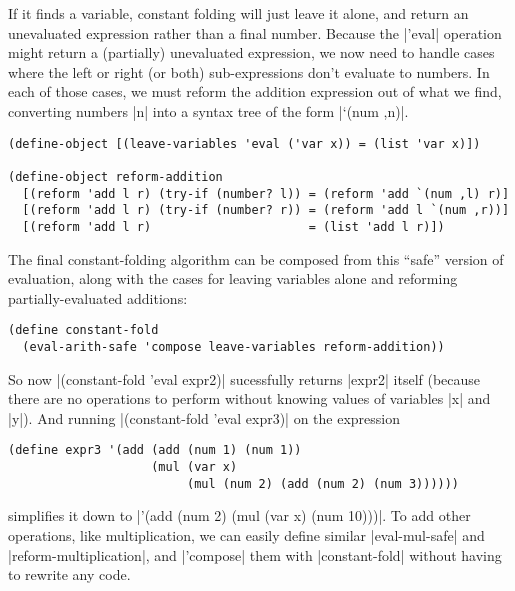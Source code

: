 If it finds a variable, constant folding will just leave it alone, and return an unevaluated expression rather than a final number.
Because the \scm|'eval| operation might return a (partially) unevaluated expression, we now need to handle cases where the left or right (or both) sub-expressions don't evaluate to numbers.
In each of those cases, we must reform the addition expression out of what we find, converting numbers \scm|n| into a syntax tree of the form \scm|`(num ,n)|.
\begin{verbatim}
(define-object [(leave-variables 'eval ('var x)) = (list 'var x)])

(define-object reform-addition
  [(reform 'add l r) (try-if (number? l)) = (reform 'add `(num ,l) r)]
  [(reform 'add l r) (try-if (number? r)) = (reform 'add l `(num ,r))]
  [(reform 'add l r)                      = (list 'add l r)])
\end{verbatim}
The final constant-folding algorithm can be composed from this ``safe'' version of evaluation, along with the cases for leaving variables alone and reforming partially-evaluated additions:
\begin{verbatim}
(define constant-fold
  (eval-arith-safe 'compose leave-variables reform-addition))
\end{verbatim}
So now \scm|(constant-fold 'eval expr2)| sucessfully returns \scm|expr2| itself (because there are no operations to perform without knowing values of variables \scm|x| and \scm|y|).
And running \scm|(constant-fold 'eval expr3)| on the expression
\begin{verbatim}
(define expr3 '(add (add (num 1) (num 1))
                    (mul (var x)
                         (mul (num 2) (add (num 2) (num 3))))))
\end{verbatim}
simplifies it down to \scm|'(add (num 2) (mul (var x) (num 10)))|.
To add other operations, like multiplication, we can easily define similar \scm|eval-mul-safe| and \scm|reform-multiplication|, and \scm|'compose| them with \scm|constant-fold| without having to rewrite any code.


